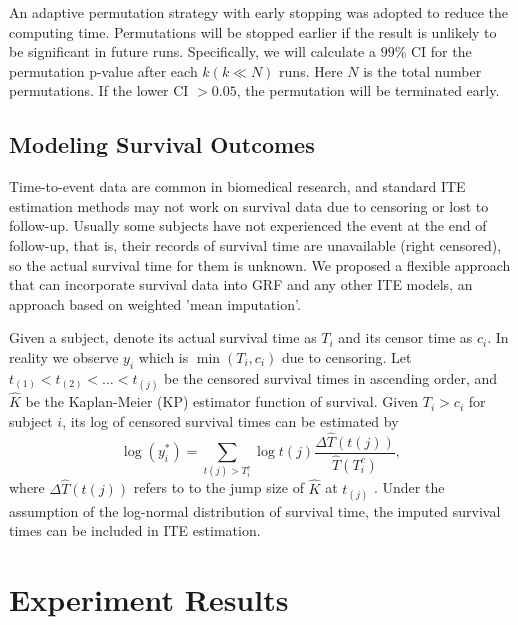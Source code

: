     An adaptive permutation strategy with early stopping was adopted to reduce the computing time. Permutations will be stopped earlier if the result is unlikely to be significant in future runs. Specifically, we will calculate a $99\%$ CI for the permutation p-value after each $k (k \ll N)$ runs. Here $N$ is the total number permutations. If the lower CI $> 0.05$, the permutation will be terminated early.

  \subsection{Modeling Survival Outcomes}
    Time-to-event data are common in biomedical research, and standard ITE estimation methods may not work on survival data due to censoring or lost to follow-up. Usually some subjects have not experienced the event at the end of follow-up, that is, their records of survival time are unavailable (right censored), so the actual survival time for them is unknown. We proposed a flexible approach that can incorporate survival data into GRF and any other ITE models, an approach based on weighted 'mean imputation'.

    Given a subject, denote its actual survival time as $T_i$ and its censor time as $c_i$. In reality we observe $y_i$ which is $\min(T_i, c_i)$ due to censoring. Let $t_{(1)}< t_{(2)} < \dots < t_{(j)}$ be the censored survival times in ascending order, and $\hat{K}$ be the Kaplan-Meier (KP) estimator function of survival. Given $T_i>c_i$ for subject $i$, its log of censored survival times can be estimated by 
    \begin{equation}
      \log (y_i^{*}) = \sum_{t(j) > T_i^c} \log t(j) \frac{\Delta \hat{T}(t(j))} {\hat{T}(T_i^c)},
    \end{equation}
    where $\Delta \hat{T}(t(j))$ refers to to the jump size of  $\hat{K}$ at $t_{(j)}$ \cite{datta2007predicting}. Under the assumption of the log-normal distribution of survival time, the imputed survival times can be included in ITE estimation. 

\section{Experiment Results}
\label{sec:ite_res}


